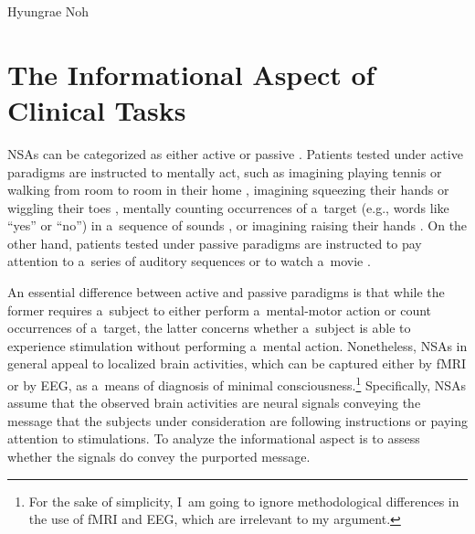 \begin{artengenv}{Hyungrae Noh}
\section{The Informational Aspect of Clinical Tasks}
NSAs can be categorized as either active or passive
\parencite[][]{kondziella_preserved_2016}. %
 Patients tested under active paradigms are instructed to mentally act, such as imagining playing tennis or walking from room to room in their home 
\parencites[][]{owen_detecting_2006}[][]{monti_willful_2010}, %
 imagining squeezing their hands or wiggling their toes 
\parencite[][]{cruse_bedside_2011}, %
 mentally counting occurrences of a~target (e.g., words like ``yes'' or ``no'') in a~sequence of sounds 
\parencites[][]{lule_probing_2013}[][]{naci_making_2013}, %
 or imagining raising their hands 
\parencite[][]{wang_detecting_2019}. %
 On the other hand, patients tested under passive paradigms are instructed to pay attention to a~series of auditory sequences 
\parencites[][]{boly_preserved_2011}[][]{king_single-trial_2013} %
 or to watch a~movie 
\parencites[][]{naci_common_2014}[][]{laforge_individualized_2020}.%


An essential difference between active and passive paradigms is that while the former requires a~subject to either perform a~mental-motor action or count occurrences of a~target, the latter concerns whether a~subject is able to experience stimulation without performing a~mental action. Nonetheless, NSAs in general appeal to localized brain activities, which can be captured either by fMRI or by EEG, as a~means of diagnosis of minimal consciousness.\footnote{For the sake of simplicity, I~am going to ignore methodological differences in the use of fMRI and EEG, which are irrelevant to my argument.} Specifically, NSAs assume that the observed brain activities are neural signals conveying the message that the subjects under consideration are following instructions or paying attention to stimulations. To analyze the informational aspect is to assess whether the signals do convey the purported message.


\end{artengenv}
